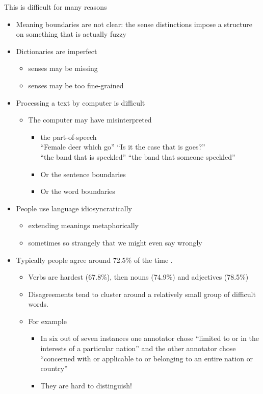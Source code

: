 \documentclass[a4paper,landscape,headrule,footrule,xetex]{foils}
\begin{document}
\begin{itemize}
 \newpage
{}
This is difficult for many reasons
  \begin{itemize}
  \item Meaning boundaries are not clear: the sense distinctions
    impose a structure on something that is actually fuzzy
  \item Dictionaries are imperfect
    \begin{itemize}
    \item senses may be missing
    \item senses may be too fine-grained
    \end{itemize}
  \item Processing a text by computer is difficult
    \begin{itemize}
    \item The computer may have misinterpreted
    \begin{itemize}
    \item the part-of-speech
      \\   ``Female deer which go'' ``Is it the case that is goes?''
      \\  ``the band that is speckled'' ``the band that someone speckled''
    \item Or the sentence boundaries
    \item Or the word boundaries
    \end{itemize}
        \end{itemize}
  \item People use language idiosyncratically 
    \begin{itemize}
    \item extending meanings metaphorically
    \item sometimes so strangely that we might even say wrongly
    \end{itemize}
  \end{itemize}
    \begin{itemize}
  \item Typically people agree around 72.5\% of the time \citep{Snyder:Palmer:2004}.
    \begin{itemize}
    \item  Verbs are hardest (67.8\%), then nouns (74.9\%) and adjectives (78.5\%)
    \item Disagreements tend to cluster around a relatively small group of difficult words.
    \item For example 
      \begin{itemize}
      \item In six out of seven instances one annotator chose
        ``limited to or in the interests of a particular nation'' and
        the other annotator chose ``concerned with or applicable to or
        belonging to an entire nation or country''
      \item They are hard to distinguish!
      \end{itemize}
    \end{itemize}
  \end{itemize}
\end{itemize}
\end{document}

